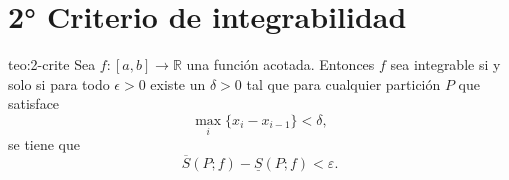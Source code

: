 \section{2° Criterio de integrabilidad}


 
\begin{teorema}{teo:2-crite}  Sea $f:[a,b]\to\mathbb{R}$ una función acotada. Entonces  $f$ sea integrable si y solo si para todo $\epsilon>0$ existe un $\delta>0$ tal que para cualquier partición $P$ que satisface
\[\max_i\{x_i-x_{i-1}\}<\delta,\]
se tiene que
\begin{equation}\label{eq:Crit1Int}
 \overline{S}(P;f)-\underline{S}(P;f)<\varepsilon.
\end{equation}
 
\end{teorema}
